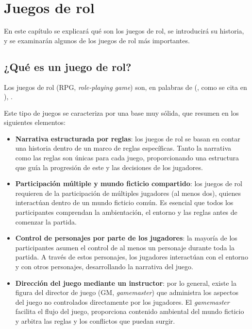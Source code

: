 \chapter{Juegos de rol}
\label{cap:juegosrol}

\begin{resumen}
En este capítulo se explicará qué son los juegos de rol, se introducirá su historia, y se examinarán algunos de los juegos de rol más importantes.
\end{resumen}

\section{¿Qué es un juego de rol?}
Los juegos de rol (RPG, \textit{role-playing game}) son, en palabras de \citeauthor{LortzRPG} (\citeyear{LortzRPG}, como se cita en \cite{FineRPG}), . 

\medskip

Este tipo de juegos se caracteriza por una base muy sólida, que \cite{TychsenRPG} resumen en los siguientes elementos:

\begin{itemize}
	\item \textbf{Narrativa estructurada por reglas}: los juegos de rol se basan en contar una historia dentro de un marco de reglas específicas. Tanto la narrativa como las reglas son únicas para cada juego, proporcionando una estructura que guía la progresión de este y las decisiones de los jugadores.
	\item \textbf{Participación múltiple y mundo ficticio compartido}: los juegos de rol requieren de la participación de múltiples jugadores (al menos dos), quienes interactúan dentro de un mundo ficticio común. Es esencial que todos los participantes comprendan la ambientación, el entorno y las reglas antes de comenzar la partida.
	\item \textbf{Control de personajes por parte de los jugadores}: la mayoría de los participantes asumen el control de al menos un personaje durante toda la partida. A través de estos personajes, los jugadores interactúan con el entorno y con otros personajes, desarrollando la narrativa del juego.
	\item \textbf{Dirección del juego mediante un instructor}: por lo general, existe la figura del director de juego (GM, \textit{gamemaster}) que administra los aspectos del juego no controlados directamente por los jugadores. El \textit{gamemaster} facilita el flujo del juego, proporciona contenido ambiental del mundo ficticio y arbitra las reglas y los conflictos que puedan surgir.
\end{itemize}

